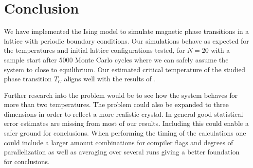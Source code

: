 \documentclass[twocolumn]{aastex62}
\begin{document}
\section{Conclusion} \label{sec:conclusion}
We have implemented the Ising model to simulate magnetic phase transitions in a
lattice with periodic boundary conditions. Our simulations behave as expected
for the temperatures and initial lattice configurations tested, for $N=20$ with
a sample start after $5000$ Monte Carlo cycles where we can safely assume the
system to close to equilibrium. Our estimated critical temperature of the
studied phase transition $T_C$ aligns well with the results of
\cite{onsager:1944}. 

Further research into the problem would be to see how the system behaves for
more than two temperatures. The problem could also be expanded to three
dimensions in order to reflect a more realistic crystal. In general good
statistical error estimates are missing from most of our results. Including this
could enable a safer ground for conclusions. When performing the timing of the
calculations one could include a larger amount combinations for compiler flags
and degrees of parallelization as well as averaging over several runs giving a
better foundation for conclusions. 

\nocite{jensen:2019}
\newpage


\end{document}
